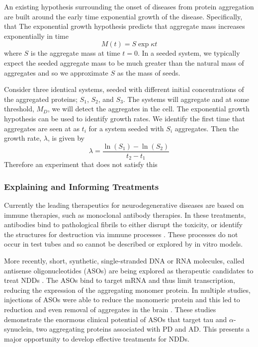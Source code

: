 An existing hypothesis surrounding the onset of diseases from protein aggregation are built around the early time exponential growth of the disease. Specifically, that 
The exponential growth hypothesis predicts that aggregate mass increases exponentially in time
\begin{equation}
    M(t) = S\exp{\kappa t}
\end{equation}
where $S$ is the aggregate mass at time $t=0$. In a seeded system, we typically expect the seeded aggregate mass to be much greater than the natural mass of aggregates and so we approximate $S$ as the mass of seeds.

Consider three identical systems, seeded with different initial concentrations of the aggregated proteins; $S_1$, $S_2$, and $S_3$. The systems will aggregate and at some threshold, $M_D$, we will detect the aggregates in the cell. The exponential growth hypothesis can be used to identify growth rates. We identify the first time that aggregates are seen at as $t_i$ for a system seeded with $S_i$ aggregates. Then the growth rate, $\lambda$, is given by
\begin{equation}
    \lambda = \frac{\ln(S_1)-\ln(S_2)}{t_2-t_1}
\end{equation}
Therefore an experiment that does not satisfy this

\subsubsection{Explaining and Informing Treatments}

Currently the leading therapeutics for neurodegenerative diseases are based on immune therapies, such as monoclonal antibody therapies. In these treatments, antibodies bind to pathological fibrils to either disrupt the toxicity, or identify the structures for destruction via immune processes \cite{wisniewski_immunotherapeutic_2015, berg_biochemistry_2002}.  These processes do not occur in test tubes and so cannot be described or explored by in vitro models.

More recently, short, synthetic, single-stranded DNA or RNA molecules, called antisense oligonucleotides (ASOs) are being explored as therapeutic candidates to treat NDDs \cite{rinaldi_antisense_2018}. The ASOs bind to target mRNA and thus limit transcription, reducing the expression of the aggregating monomer protein. In multiple studies, injections of ASOs were able to reduce the monomeric protein and this led to reduction and even removal of aggregates in the brain \cite{cole_-synuclein_nodate, devos_tau_2017, mummery_tau-targeting_2023}. These studies demonstrate the enormous clinical potential of ASOs that target tau and $\alpha$-synuclein, two aggregating proteins associated with PD and AD. This presents a major opportunity to develop effective treatments for NDDs.

